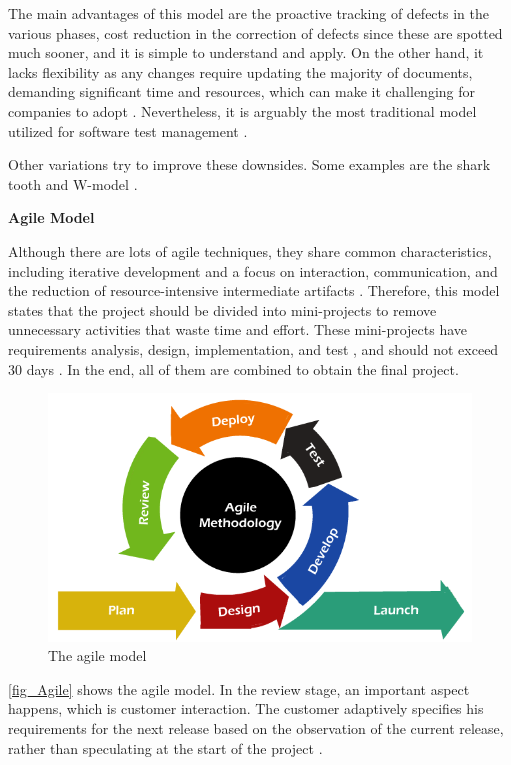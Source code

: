 The main advantages of this model are the proactive tracking of defects in the various phases, cost reduction in the correction of defects since these are 
spotted much sooner, and it is simple to understand and apply. On the other hand, it lacks flexibility as any changes require updating the majority 
of documents, demanding significant time and resources, which can make it challenging for companies to adopt \cite{V-model} \cite{V-model2}. 
Nevertheless, it is arguably the most traditional model utilized for software test management \cite{mathur2010advancements}.

Other variations try to improve these downsides. Some examples are the shark tooth and W-model \cite{V-model2}.
\newline

\textbf{Agile Model}
\newline

Although there are lots of agile techniques, they share common characteristics, including iterative development and a focus on interaction, 
communication, and the reduction of resource-intensive intermediate artifacts \cite{waterfallAndAgile}. Therefore, this model states that the 
project should be divided into mini-projects to remove unnecessary activities that waste time and effort. These mini-projects have requirements 
analysis, design, implementation, and test \cite{waterfallAndAgile}, and should not exceed 30 days \cite{AgileModel}. In the end, all of them are 
combined to obtain the final project.

\begin{figure}[H]
	\centering
 	\includegraphics[width=0.5\linewidth]{Images/agileModel.png}
 	\caption{The agile model}
	 \label{fig_Agile}
\end{figure}

\autoref{fig_Agile} shows the agile model. In the review stage, an important aspect happens, which is customer interaction. 
The customer adaptively specifies his requirements for the next release based on the observation of the current release, rather than speculating 
at the start of the project \cite{SpiralModel}. 
\newline

